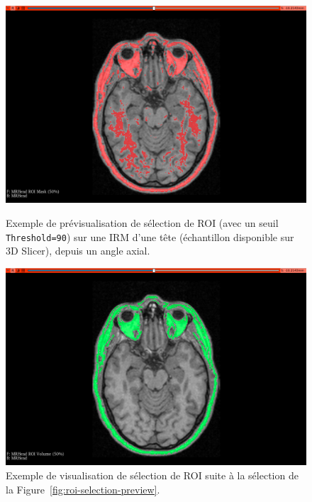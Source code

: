 \documentclass{article}
\begin{document}
{{{{                \begin{figure}[!ht]
                    \centering
                    \begin{minipage}[t]{0.45\textwidth}
                        \centering
                        \includegraphics[width=\textwidth]{images/roi-selection-preview.png}
                        \caption{Exemple de prévisualisation de sélection de ROI (avec un seuil \texttt{Threshold=90}) sur une IRM d'une tête (échantillon disponible sur 3D Slicer), depuis un angle axial.}
                        \label{fig:roi-selection-preview}
                    \end{minipage}
                    \hfill
                    \begin{minipage}[t]{0.45\textwidth}
                        \centering
                        \includegraphics[width=\textwidth]{images/roi-selection-view.png}
                        \caption{Exemple de visualisation de sélection de ROI suite à la sélection de la Figure~\ref{fig:roi-selection-preview}.}
                        \label{fig:roi-selection-view}
                    \end{minipage}
                \end{figure}

}}}}
\end{document}
